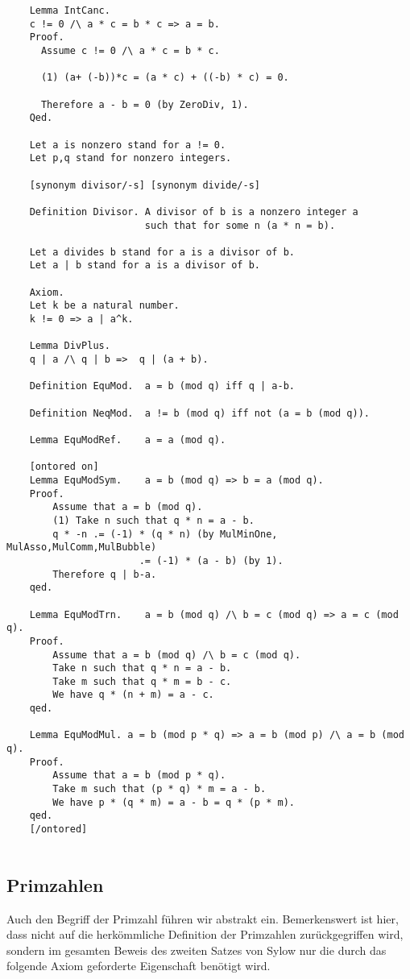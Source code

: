 \documentclass[a4paper,12pt]{scrartcl}
\begin{document}
\begin{lstlisting}
	Lemma IntCanc.
	c != 0 /\ a * c = b * c => a = b.
	Proof.
	  Assume c != 0 /\ a * c = b * c.
	  
	  (1) (a+ (-b))*c = (a * c) + ((-b) * c) = 0.
	  
	  Therefore a - b = 0 (by ZeroDiv, 1).
	Qed.
	
	Let a is nonzero stand for a != 0.
	Let p,q stand for nonzero integers.
	
	[synonym divisor/-s] [synonym divide/-s]
	
	Definition Divisor. A divisor of b is a nonzero integer a
						such that for some n (a * n = b).
	
	Let a divides b stand for a is a divisor of b.
    Let a | b stand for a is a divisor of b.
    
    Axiom.
	Let k be a natural number.
	k != 0 => a | a^k.
	
	Lemma DivPlus.
	q | a /\ q | b =>  q | (a + b).
	
	Definition EquMod.  a = b (mod q) iff q | a-b.
	
	Definition NeqMod.  a != b (mod q) iff not (a = b (mod q)).
	
	Lemma EquModRef.    a = a (mod q).
	
	[ontored on]
	Lemma EquModSym.    a = b (mod q) => b = a (mod q).
	Proof.
		Assume that a = b (mod q).
		(1) Take n such that q * n = a - b.
		q * -n .= (-1) * (q * n) (by MulMinOne, MulAsso,MulComm,MulBubble)
					   .= (-1) * (a - b) (by 1).
		Therefore q | b-a.
	qed.
	
	Lemma EquModTrn.    a = b (mod q) /\ b = c (mod q) => a = c (mod q).
	Proof.
		Assume that a = b (mod q) /\ b = c (mod q).
		Take n such that q * n = a - b.
		Take m such that q * m = b - c.
		We have q * (n + m) = a - c.
	qed.
	
	Lemma EquModMul. a = b (mod p * q) => a = b (mod p) /\ a = b (mod q).
	Proof.
		Assume that a = b (mod p * q).
		Take m such that (p * q) * m = a - b.
		We have p * (q * m) = a - b = q * (p * m).
	qed.
	[/ontored]
	
\end{lstlisting}

\subsection{Primzahlen}

Auch den Begriff der Primzahl führen wir abstrakt ein. Bemerkenswert ist hier, dass nicht auf die herkömmliche Definition der Primzahlen zurückgegriffen wird, sondern im gesamten Beweis des zweiten Satzes von Sylow nur die durch das folgende Axiom geforderte Eigenschaft benötigt wird.
\end{document}

